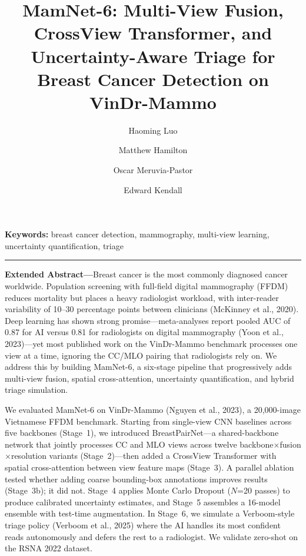 \documentclass[10pt,letterpaper]{article}
\date{}
\title{MamNet-6: Multi-View Fusion, CrossView Transformer, and
Uncertainty-Aware Triage for Breast Cancer Detection on VinDr-Mammo}
\author[1]{Haoming Luo}
\author[1]{Matthew Hamilton}
\author[1]{Oscar Meruvia-Pastor}
\author[1]{Edward Kendall}
\affil[1]{\small Department of Computer Science, Memorial University,
St.\ John's, NL, Canada\\
\texttt{hluo@mun.ca}}
\begin{document}
\maketitle
\thispagestyle{empty}
\vspace{-8pt}

\noindent\textbf{Keywords:} breast cancer detection, mammography, multi-view
learning, uncertainty quantification, triage

\vspace{4pt}
\hrule
\vspace{8pt}

\noindent\textbf{Extended Abstract---}Breast cancer is the most commonly
diagnosed cancer worldwide. Population screening with full-field digital
mammography (FFDM) reduces mortality but places a heavy radiologist workload,
with inter-reader variability of 10--30 percentage points between clinicians
(McKinney et al., 2020). Deep learning has shown strong promise---meta-analyses
report pooled AUC of 0.87 for AI versus 0.81 for radiologists on digital
mammography (Yoon et al., 2023)---yet most published work on the
VinDr-Mammo benchmark processes one view at a time, ignoring the CC/MLO
pairing that radiologists rely on. We address this by building MamNet-6, a
six-stage pipeline that progressively adds multi-view fusion, spatial
cross-attention, uncertainty quantification, and hybrid triage simulation.

We evaluated MamNet-6 on VinDr-Mammo (Nguyen et al., 2023), a 20,000-image
Vietnamese FFDM benchmark. Starting from single-view CNN baselines across five
backbones (Stage~1), we introduced BreastPairNet---a shared-backbone network
that jointly processes CC and MLO views across twelve
backbone$\times$fusion$\times$resolution variants (Stage~2)---then added a
CrossView Transformer with spatial cross-attention between view feature maps
(Stage~3). A parallel ablation tested whether adding coarse bounding-box
annotations improves results (Stage~3b); it did not. Stage~4 applies Monte
Carlo Dropout ($N$=20 passes) to produce calibrated uncertainty estimates, and
Stage~5 assembles a 16-model ensemble with test-time augmentation. In Stage~6,
we simulate a Verboom-style triage policy (Verboom et al., 2025) where the AI
handles its most confident reads autonomously and defers the rest to a
radiologist. We validate zero-shot on the RSNA 2022 dataset.
\end{document}
